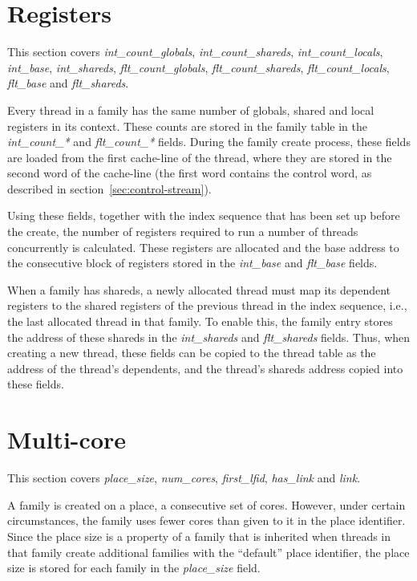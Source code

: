 \section{Registers}
This section covers \emph{int\_count\_globals}, \emph{int\_count\_shareds}, \emph{int\_count\_locals}, \emph{int\_base}, \emph{int\_shareds}, \emph{flt\_count\_globals}, \emph{flt\_count\_shareds}, \emph{flt\_count\_locals}, \emph{flt\_base} and \emph{flt\_shareds}.

Every thread in a family has the same number of globals, shared and local registers in its context. These counts are stored in the family table in the \emph{int\_count\_*} and \emph{flt\_count\_*} fields. During the family create process, these fields are loaded from the first cache-line of the thread, where they are stored in the second word of the cache-line (the first word contains the control word, as described in section~\ref{sec:control-stream}).

Using these fields, together with the index sequence that has been set up before the create, the number of registers required to run a number of threads concurrently is calculated. These registers are allocated and the base address to the consecutive block of registers stored in the \emph{int\_base} and \emph{flt\_base} fields.

When a family has shareds, a newly allocated thread must map its dependent registers to the shared registers of the previous thread in the index sequence, i.e., the last allocated thread in that family. To enable this, the family entry stores the address of these shareds in the \emph{int\_shareds} and \emph{flt\_shareds} fields. Thus, when creating a new thread, these fields can be copied to the thread table as the address of the thread's dependents, and the thread's shareds address copied into these fields.

\section{Multi-core}
This section covers \emph{place\_size}, \emph{num\_cores}, \emph{first\_lfid}, \emph{has\_link} and \emph{link}.

A family is created on a place, a consecutive set of cores. However, under certain circumstances, the family uses fewer cores than given to it in the place identifier. Since the place size is a property of a family that is inherited when threads in that family create additional families with the ``default'' place identifier, the place size is stored for each family in the \emph{place\_size} field.

